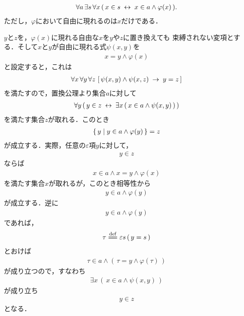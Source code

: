 	\begin{screen}
		\begin{thm}[分出定理]
			\begin{align}
				\forall a\, \exists s\, \forall x\,
				(\, x \in s \hspace{0.25em}\leftrightarrow\hspace{0.25em} x \in a \wedge \varphi(x)\, ).
			\end{align}
			ただし，$\varphi$において自由に現れるのは$x$だけである．
		\end{thm}
	\end{screen}
	
	\begin{sketch}
		$y$と$z$を，$\varphi(x)$に現れる自由な$x$を$y$や$z$に置き換えても
		束縛されない変項とする．そして$x$と$y$が自由に現れる式$\psi(x,y)$を
		\begin{align}
			x = y \wedge \varphi(x)
		\end{align}
		と設定すると，これは
		\begin{align}
			\forall x\, \forall y\, \forall z\, 
			\left[\, \psi(x,y) \wedge \psi(x,z) \hspace{0.25em}\rightarrow\hspace{0.25em} y = z\, \right]
		\end{align}
		を満たすので，置換公理より集合$a$に対して
		\begin{align}
			\forall y\, (\, y \in z \hspace{0.25em}\leftrightarrow\hspace{0.25em} \exists x\, (\, x \in a \wedge 
			\psi(x,y)\, )\, )
		\end{align}
		を満たす集合$z$が取れる．このとき
		\begin{align}
			\left\{\, y \mid y \in a \wedge \varphi(y)\, \right\} = z
		\end{align}
		が成立する．実際，任意の$\varepsilon$項$y$に対して，
		\begin{align}
			y \in z
		\end{align}
		ならば
		\begin{align}
			x \in a \wedge x = y \wedge \varphi(x)
		\end{align}
		を満たす集合$x$が取れるが，このとき相等性から
		\begin{align}
			y \in a \wedge \varphi(y)
		\end{align}
		が成立する．逆に
		\begin{align}
			y \in a \wedge \varphi(y)
		\end{align}
		であれば，
		\begin{align}
			\tau \defeq \varepsilon s\, (\, y = s\, )
		\end{align}
		とおけば
		\begin{align}
			\tau \in a \wedge (\, \tau = y \wedge \varphi(\tau)\, )
		\end{align}
		が成り立つので，すなわち
		\begin{align}
			\exists x\, (\, x \in a \wedge \psi(x,y)\, )
		\end{align}
		が成り立ち
		\begin{align}
			y \in z
		\end{align}
		となる．
		\QED
	\end{sketch}
	
